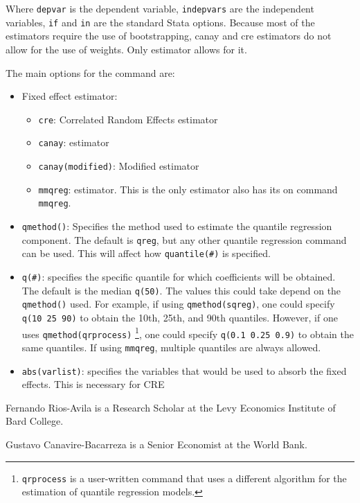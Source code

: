 \documentclass[bib]{statapress}
\providecommand{\tightlist}{%
  \setlength{\itemsep}{0pt}\setlength{\parskip}{0pt}}\usepackage{longtable,booktabs,array}
\begin{document}
Where \texttt{depvar} is the dependent variable, \texttt{indepvars} are
the independent variables, \texttt{if} and \texttt{in} are the standard
Stata options. Because most of the estimators require the use of
bootstrapping, canay and cre estimators do not allow for the use of
weights. Only \citet{mss} estimator allows for it.

The main options for the command are:

\begin{itemize}
\tightlist
\item
  Fixed effect estimator:

  \begin{itemize}
  \tightlist
  \item
    \texttt{cre}: Correlated Random Effects estimator
  \item
    \texttt{canay}: \citet{canay2011} estimator
  \item
    \texttt{canay(modified)}: Modified \citet{canay2011} estimator
  \item
    \texttt{mmqreg}: \citet{mss2019} estimator. This is the only
    estimator also has its on command \texttt{mmqreg}.
  \end{itemize}
\item
  \texttt{qmethod()}: Specifies the method used to estimate the quantile
  regression component. The default is \texttt{qreg}, but any other
  quantile regression command can be used. This will affect how
  \texttt{quantile(\#)} is specified.
\item
  \texttt{q(\#)}: specifies the specific quantile for which coefficients
  will be obtained. The default is the median \texttt{q(50)}. The values
  this could take depend on the \texttt{qmethod()} used. For example, if
  using \texttt{qmethod(sqreg)}, one could specify
  \texttt{q(10\ 25\ 90)} to obtain the 10th, 25th, and 90th quantiles.
  However, if one uses \texttt{qmethod(qrprocess)} \footnote{\texttt{qrprocess}
    is a user-written command that uses a different algorithm for the
    estimation of quantile regression models.}, one could specify
  \texttt{q(0.1\ 0.25\ 0.9)} to obtain the same quantiles. If using
  \texttt{mmqreg}, multiple quantiles are always allowed.
\item
  \texttt{abs(varlist)}: specifies the variables that would be used to
  absorb the fixed effects. This is necessary for CRE
\end{itemize}

\clearpage





\begin{aboutauthors}

Fernando Rios-Avila is a Research Scholar at the Levy Economics
Institute of Bard College.

Gustavo Canavire-Bacarreza is a Senior Economist at the World Bank.

\end{aboutauthors}
\end{document}

